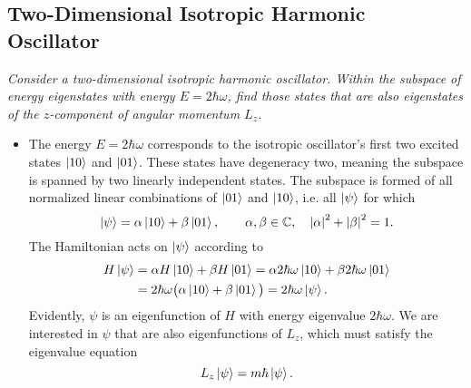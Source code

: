 \documentclass[11pt, a4paper]{article}
\begin{document}
\subsection{Two-Dimensional Isotropic Harmonic Oscillator} \label{qmv:ss:2dqho}
\textit{Consider a two-dimensional isotropic harmonic oscillator. Within the subspace of energy eigenstates with energy $ E = 2\hbar \omega $, find those states that are also eigenstates of the $ z $-component of angular momentum $ L_{z} $.}
\begin{itemize}
	\item The energy $ E = 2\hbar \omega $ corresponds to the isotropic oscillator's first two excited states $ \ket{10} $ and $ \ket{01} $. These states have degeneracy two, meaning the subspace is spanned by two linearly independent states. The subspace is formed of all normalized linear combinations of $ \ket{01} $ and $ \ket{10} $, i.e. all $ \ket{\psi} $ for which
	\begin{equation*}
		\ket{\psi} = \alpha \ket{10} + \beta \ket{01}, \qquad \alpha, \beta \in \mathbb{C}, \quad \abs{\alpha}^{2} + \abs{\beta}^{2} = 1.
	\end{equation*}
	The Hamiltonian acts on $ \ket{\psi} $ according to
	\begin{align*}
		H \ket{\psi} &= \alpha H \ket{10} + \beta H \ket{01} = \alpha 2\hbar \omega \ket{10} + \beta 2\hbar \omega \ket{01}\\
		&=2\hbar \omega \big(\alpha \ket{10} + \beta \ket{01}\big) = 2\hbar \omega \ket{\psi}.
	\end{align*}
	Evidently, $ \psi $ is an eigenfunction of $ H $ with energy eigenvalue $ 2\hbar \omega $.	We are interested in $ \psi $ that are also eigenfunctions of $ L_{z} $, which must satisfy the eigenvalue equation
	\begin{equation*}
		L_{z}\ket{\psi} = m \hbar \ket{\psi}.
	\end{equation*}
	

\end{itemize}
\end{document}
